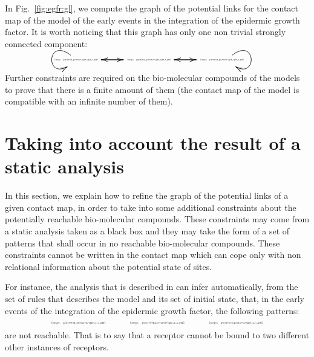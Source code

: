 \documentclass{entcs}
\begin{document}
\begin{exmp}
In Fig.~\ref{fig:egfr:gl}, we compute the graph of the potential links for the contact map of the model of the early events in the integration of the epidermic growth factor. It is worth noticing that this graph has only one non trivial strongly connected component:
\begin{equation*}\hspace*{1cm}\scalebox{1.5}{\xymatrix@C=0.2cm@R=0.35cm{\begin{minipage}{1.2cm}\scalebox{0.15}{\texttt{[image: generated\_pictures/egfr\_egfr\_c.pdf]}}\end{minipage}
  \ar@{->}[rr]
  \ar@{->}@(ul,dl)
  &&
\begin{minipage}{1.2cm}\scalebox{0.15}{\texttt{[image: generated\_pictures/egfr\_egfr\_r.pdf]}}\end{minipage}
  \ar@{->}[ll]
  \ar@{->}[rr]&&
\begin{minipage}{1.5cm}\scalebox{0.15}{\texttt{[image: generated\_pictures/egfr\_egfr\_n.pdf]}}\end{minipage}
  \ar@{->}[ll]
  \ar@{->}@(ur,dr)&&}}\end{equation*}
Further constraints are required on the bio-molecular compounds of the models to prove that there is a finite amount of them (the contact map of the model is compatible with an infinite number of them).
\end{exmp}

\section{Taking into account the result of a static analysis}

In this section, we explain how to refine the graph of the potential links of a given contact map, in order to take into some additional constraints about the potentially reachable bio-molecular compounds.
These constraints may come from a static analysis \cite{SASB2016,KaSa} taken as a black box and they may take the form of a set of patterns that shall occur in no reachable bio-molecular compounds.
These constraints cannot be written in the contact map which can cope only with non relational information about the potential state of sites.

For instance, the analysis that is described in \cite{SASB2016} can infer automatically, from the set of rules that describes the model and its set of initial state, that, in the early events of the integration of the epidermic growth factor, the following patterns:
\begin{equation*}
\scalebox{0.3}{\texttt{[image: generated\_pictures/egfr\_r\_c.pdf]}}\hspace*{1cm} \scalebox{0.3}{\texttt{[image: generated\_pictures/egfr\_r\_n.pdf]}}\hspace*{1cm} \scalebox{0.3}{\texttt{[image: generated\_pictures/egfr\_n\_c.pdf]}}
\end{equation*}
are not reachable. That is to say that a receptor cannot be bound to two different other instances of receptors.
\end{document}
